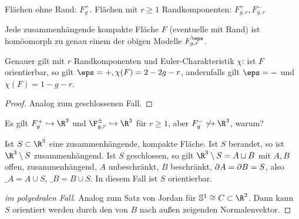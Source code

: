 
Flächen ohne Rand: $F_g^+$.
Flächen mit $r \ge 1$ Randkomponenten: $F_{g,r}^+, F_{g,r}^-$

\begin{st}
	Jede zusammenhängende kompakte Fläche $F$ (eventuelle mit Rand) ist homöomorph zu genau einem der obigen Modelle $F_{g,r}^\eps$.

	Genauer gilt mit $r$ Randkomponenten und Euler-Charakteristik $\chi$: ist $F$ orientierbar, so gilt $\eps = +, \chi(F) = 2 - 2g - r$, andernfalls gilt $\eps = -$ und $\chi(F) = 1 - g - r$.
	\begin{proof}
		Analog zum geschlossenen Fall.
	\end{proof}
\end{st}

Es gilt $F_g^+ \injto \R^3$ und $\F_{g,r}^{\pm} \injto \R^3$ für $r \ge 1$, aber $F_g^- \not\injto \R^3$, warum?

\begin{st}
	Ist $S \subset \R^3$ eine zusammenhängende, kompakte Fläche.
	Ist $S$ berandet, so ist $\R^3 \setminus S$ zusammenhängend.
	Ist $S$ geschlossen, so gilt $\R^3 \setminus S = A \dunion B$ mit $A, B$ offen, zusammenhängend, $A$ unbeschränkt, $B$ beschränkt, $\partial A = \partial B = S$, also $\_A = A \cup S$, $\_B = B \cup S$.
	In diesem Fall ist $S$ orientierbar.
	\begin{proof}[im polyedralen Fall]
		Analog zum Satz von Jordan für $\S^1 \homeomorphic C \subset \R^2$.
		Dann kann $S$ orientiert werden durch den von $B$ nach außen zeigenden Normalenvektor.
	\end{proof}
\end{st}
